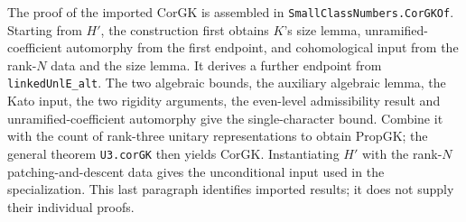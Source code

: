 The proof of the imported \(\mathrm{CorGK}\) is assembled in
\texttt{Small\allowbreak{}Class\allowbreak{}Numbers.\allowbreak{}Cor\allowbreak{}GKOf}. Starting from \(H'\), the
construction first obtains \(K\)'s size lemma, unramified-coefficient
automorphy from the first endpoint, and cohomological input from the
rank-\(N\) data and the size lemma. It derives a further endpoint from
\texttt{linked\allowbreak{}Unl\allowbreak{}E\_\allowbreak{}alt}. The two algebraic bounds, the auxiliary
algebraic lemma, the Kato input, the two rigidity arguments, the
even-level admissibility result and unramified-coefficient automorphy
give the single-character bound. Combine it with the count of
rank-three unitary representations to obtain \(\mathrm{PropGK}\);
the general theorem \texttt{U3.\allowbreak{}cor\allowbreak{}GK} then yields \(\mathrm{CorGK}\).
Instantiating \(H'\) with the rank-\(N\) patching-and-descent data gives
the unconditional input used in the specialization. This last
paragraph identifies imported results; it does not supply their
individual proofs.
